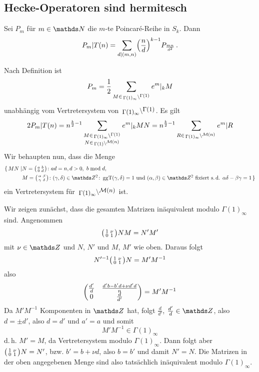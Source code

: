 \subsection{Hecke-Operatoren sind hermitesch}

\begin{satz}\label{Hecke(Pm)}
Sei $P_m$ für $m \in \NN$ die $m$-te Poincaré-Reihe in $S_k$.
Dann
\[
	P_m | T(n) = \sum_{d | (m,n)} \Bigl( \frac{n}{d} \Bigr)^{k-1} P_{\frac{mn}{d^2}}
\,.
\]
\end{satz}
\begin{bewe}
Nach Definition ist
\[
P_m = \frac{1}{2} \sum_{M\in \linksmodulo{\Gamma(1)_\infty}{\Gamma(1)}} e^m |_k M
\]
unabhängig vom Vertretersystem von $\linksmodulo{\Gamma(1)_\infty}{\Gamma(1)}$.
Es gilt
\[
2 P_m | T(n) = n^{\frac{k}{2}-1} \sum_{\substack{M \in \linksmodulo{\Gamma(1)_\infty}{\Gamma(1)}\\ N \in \linksmodulo{\Gamma(1)}{\mathcal{M}(n)}}} e^m|_k MN
= n^{\frac{k}{2}-1} \sum_{R \in \linksmodulo{\Gamma(1)_\infty}{\mathcal{M}(n)}} e^m|R
\]
Wir behaupten nun, dass die Menge 
\begin{equation*}
\begin{split}
\{\,MN \mid &N = \mymat ab0d\colon ad=n, d>0,\ b \bmod d, \\ &M = \mymat \alpha\beta\gamma\delta\colon (\gamma, \delta) \in \ZZ^2\colon \ggt(\gamma, \delta) = 1 \text{ und } (\alpha, \beta) \in \ZZ^2 \text{ fixiert s.\,d. } \alpha\delta - \beta\gamma = 1\,\}
\end{split}
\end{equation*}
ein Vertretersystem für $\linksmodulo{\Gamma(1)_\infty}{\mathcal{M}(n)}$ ist.

Wir zeigen zunächst, dass die gesamten Matrizen inäquivalent modulo $\Gamma(1)_\infty$ sind.
Angenommen
\[
\mymat 1\nu01 NM = N'M'
\]
mit $\nu \in \ZZ$ und $N$, $N'$ und $M$, $M'$ wie oben.
Daraus folgt
\[
N'^{-1} \mymat 1\nu01 N = M'M^{-1}
\]
also
\[
\mymat*{\frac{d'}{d}}{\frac{d'b-b'd+\nu d'd}{n}}{0}{\frac{d}{d'}}
= M' M^{-1}
\]
Da $M'M^{-1}$ Komponenten in $\ZZ$ hat, folgt $\frac{d}{d'}$, $\frac{d'}{d} \in \ZZ$, also $d = \pm d'$, also $d = d'$ und $a' = a$ und somit 
\[
M'M^{-1} \in \Gamma(1)_\infty
\]
d.\,h. $M' = M$, da Vertretersystem modulo $\Gamma(1)_\infty$.
Dann folgt aber $\mymat 1\nu01 N = N'$, bzw. $b' = b + \nu d$, also $b = b'$ und damit $N' = N$. Die Matrizen in der oben angegebenen Menge sind also tatsächlich inäquivalent modulo $\Gamma(1)_\infty$. 


\end{bewe}
